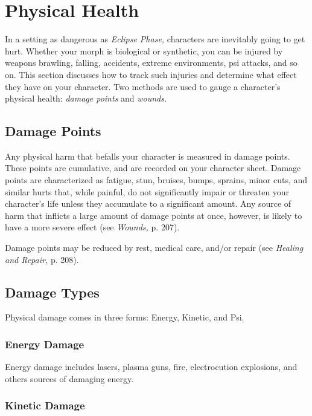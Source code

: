 \section{Physical Health}

In a setting as dangerous as \textit{Eclipse Phase,} characters 
are inevitably going to get hurt. Whether your morph 
is biological or synthetic, you can be injured by weapons
brawling, falling, accidents, extreme environments,
psi attacks, and so on. This section discusses how to 
track such injuries and determine what effect they have 
on your character. Two methods are used to gauge a 
character's physical health: \textit{damage points} and \textit{wounds.}

\subsection{Damage Points}

Any physical harm that befalls your character is measured
in damage points. These points are cumulative,
and are recorded on your character sheet. Damage 
points are characterized as fatigue, stun, bruises, 
bumps, sprains, minor cuts, and similar hurts that, 
while painful, do not significantly impair or threaten 
your character's life unless they accumulate to a significant
amount. Any source of harm that inflicts a large
amount of damage points at once, however, is likely to 
have a more severe effect (see \textit{Wounds,} p. 207).

Damage points may be reduced by rest, medical 
care, and/or repair (see \textit{Healing and Repair,} p. 208).

\subsection{Damage Types}

Physical damage comes in three forms: Energy, Kinetic, 
and Psi.

\subsubsection{Energy Damage}

Energy damage includes lasers, plasma guns, fire, electrocution
explosions, and others sources of damaging energy.

\subsubsection{Kinetic Damage}

